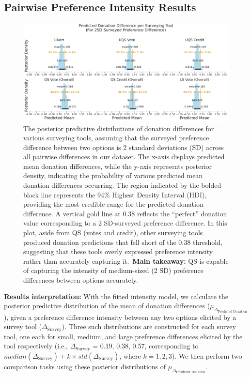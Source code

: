 \subsection{Pairwise Preference Intensity Results}
\label{sec:result_2}

\begin{figure}[h]
    \centering
    \includegraphics[width=\textwidth]{content/image/intensity_2sd.pdf}
    \caption[]{
    The posterior predictive distributions of donation differences for various surveying tools, assuming that the surveyed preference difference between two options is 2 standard deviations (SD) across all pairwise differences in our dataset. The x-axis displays predicted mean donation differences, while the y-axis represents posterior density, indicating the probability of various predicted mean donation differences occurring. The region indicated by the bolded black line represents the 94\% Highest Density Interval (HDI), providing the most credible range for the predicted donation difference. A vertical gold line at 0.38 reflects the ``perfect'' donation value corresponding to a 2 SD-surveyed preference difference. In this plot, aside from QS (votes and credit), other surveying tools produced donation predictions that fell short of the 0.38 threshold, suggesting that these tools overly expressed preference intensity rather than accurately capturing it.~\textbf{Main takeaway:} QS is capable of capturing the intensity of medium-sized (2 SD) preference differences between options accurately.
    }
    \label{fig:donation_posterior}
\end{figure}


\textbf{Results interpretation:} With the fitted intensity model, we calculate the posterior predictive distribution of the mean of donation differences ($\mu_{\Delta_{\text{Predicted Donation}}}$), given a preference difference intensity between any two options elicited by a survey tool ($\Delta_{\text{Survey}}$). Three such distributions are constructed for each survey tool, one each for small, medium, and large preference differences elicited by the tool respectively (i.e., $\Delta_{\text{Survey}}$ = 0.19, 0.38, 0.57, corresponding to $median(\Delta_{\text{Survey}})+k \times std(\Delta_{\text{Survey}})$, where $k=1, 2, 3$). We then perform two comparison tasks using these posterior distributions of $\mu_{\Delta_{\text{Predicted Donation}}}$. 

